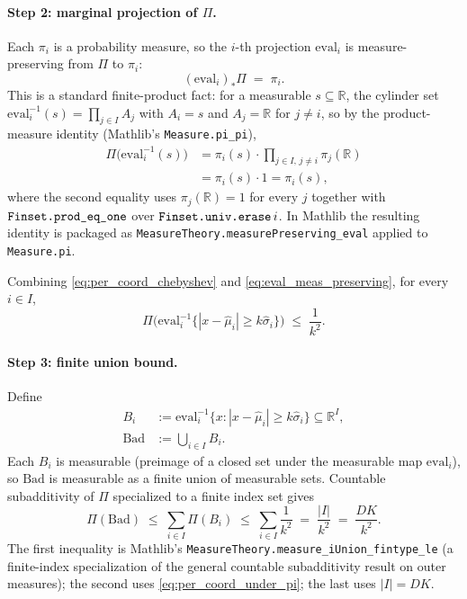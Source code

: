 \documentclass[opre,dblanonrev]{informs4}
\renewcommand{\mathtt}[1]{\mbox{\ttfamily #1}}
\begin{document}
\begin{APPENDICES}
\paragraph{Step 2: marginal projection of $\Pi$.}
Each $\pi_i$ is a probability measure, so the $i$-th projection
$\mathrm{eval}_i$ is measure-preserving from $\Pi$ to $\pi_i$:
\begin{equation}
(\mathrm{eval}_i)_*\Pi \;=\; \pi_i.
\label{eq:eval_meas_preserving}
\end{equation}
This is a standard finite-product fact: for a measurable
$s \subseteq \mathbb{R}$, the cylinder set
$\mathrm{eval}_i^{-1}(s) = \prod_{j \in I} A_j$ with $A_i = s$ and
$A_j = \mathbb{R}$ for $j \neq i$, so by the product-measure
identity (Mathlib's \texttt{Measure.pi\_pi}),
\begin{align*}
\Pi\bigl(\mathrm{eval}_i^{-1}(s)\bigr)
  &= \pi_i(s) \cdot \!\prod_{j \in I,\, j \neq i}\! \pi_j(\mathbb{R}) \\
  &= \pi_i(s) \cdot 1 = \pi_i(s),
\end{align*}
where the second equality uses $\pi_j(\mathbb{R}) = 1$ for every
$j$ together with $\mathtt{Finset.prod\_eq\_one}$ over
$\mathtt{Finset.univ.erase}\,i$. In Mathlib the resulting
identity is packaged as
\texttt{MeasureTheory.measurePreserving\_eval} applied to
\texttt{Measure.pi}.

Combining \eqref{eq:per_coord_chebyshev} and
\eqref{eq:eval_meas_preserving}, for every $i \in I$,
\begin{equation}
\Pi\bigl(\mathrm{eval}_i^{-1}\{|x - \hat\mu_i| \geq k\hat\sigma_i\}\bigr)
\;\leq\; \frac{1}{k^2}.
\label{eq:per_coord_under_pi}
\end{equation}

\paragraph{Step 3: finite union bound.}
Define
\begin{align*}
B_i &:= \mathrm{eval}_i^{-1}\{x : |x - \hat\mu_i| \geq k\hat\sigma_i\}
       \subseteq \mathbb{R}^I, \\
\mathrm{Bad} &:= \bigcup_{i \in I} B_i.
\end{align*}
Each $B_i$ is measurable (preimage of a closed set under the
measurable map $\mathrm{eval}_i$), so $\mathrm{Bad}$ is measurable
as a finite union of measurable sets. Countable subadditivity of
$\Pi$ specialized to a finite index set gives
\begin{equation}
\Pi(\mathrm{Bad}) \;\leq\; \sum_{i \in I} \Pi(B_i)
\;\leq\; \sum_{i \in I} \frac{1}{k^2}
\;=\; \frac{|I|}{k^2}
\;=\; \frac{DK}{k^2}.
\label{eq:union_bound}
\end{equation}
The first inequality is Mathlib's
\texttt{MeasureTheory.measure\_iUnion\_fintype\_le} (a finite-index
specialization of the general countable subadditivity result on
outer measures); the second uses \eqref{eq:per_coord_under_pi}; the
last uses $|I| = DK$.


\end{APPENDICES}
\end{document}
